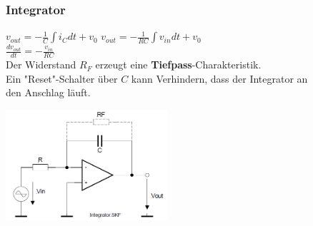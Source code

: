		\subsubsection{Integrator} 
		\vspace{1cm}
		\begin{minipage}[b]{12cm}
		$v_{out}=-\frac{1}{C} \int{i_C}dt + v_0$
		$v_{out}=-\frac{1}{RC} \int{v_{in}}dt +
		v_0 $\\
		$\frac{dv_{out}}{dt}=-\frac{v_{in}}{RC}$\\
		Der Widerstand $R_F$ erzeugt eine {\bf Tiefpass}-Charakteristik. \\
		Ein "Reset"-Schalter über $C$ kann Verhindern, dass der Integrator an\\
		den Anschlag läuft.
		\end{minipage} 
		\begin{minipage}[c]{6cm}
          	\includegraphics[width=6cm]{./images/integrator.png} 
        \end{minipage}\\
        
